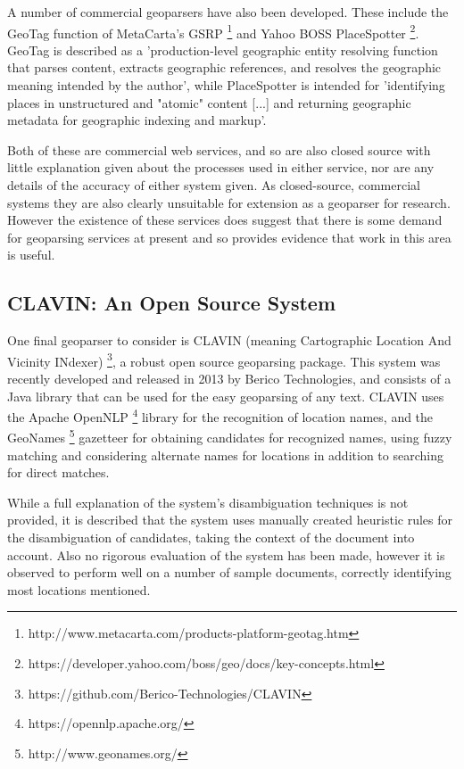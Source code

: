 \documentclass[12pt, a4paper]{report}
\begin{document}
A number of commercial geoparsers have also been developed. These include the GeoTag function of MetaCarta's GSRP \footnote{http://www.metacarta.com/products-platform-geotag.htm} and Yahoo BOSS PlaceSpotter \footnote{https://developer.yahoo.com/boss/geo/docs/key-concepts.html}. GeoTag is described as a 'production-level geographic entity resolving function that parses content, extracts geographic references, and resolves the geographic meaning intended by the author', while PlaceSpotter is intended for 'identifying places in unstructured and "atomic" content [...] and returning geographic metadata for geographic indexing and markup'.

Both of these are commercial web services, and so are also closed source with little explanation given about the processes used in either service, nor are any details of the accuracy of either system given. As closed-source, commercial systems they are also clearly unsuitable for extension as a geoparser for research. However the existence of these services does suggest that there is some demand for geoparsing services at present and so provides evidence that work in this area is useful.
 
\subsection{CLAVIN: An Open Source System}
\label{subsec:clavin}

One final geoparser to consider is CLAVIN (meaning Cartographic Location And Vicinity INdexer) \footnote{https://github.com/Berico-Technologies/CLAVIN}, a robust open source geoparsing package. This system was recently developed and released in 2013 by Berico Technologies, and consists of a Java library that can be used for the easy geoparsing of any text. CLAVIN uses the Apache OpenNLP \footnote{https://opennlp.apache.org/} library for the recognition of location names, and the GeoNames \footnote{http://www.geonames.org/} gazetteer for obtaining candidates for recognized names, using fuzzy matching and considering alternate names for locations in addition to searching for direct matches.

While a full explanation of the system's disambiguation techniques is not provided, it is described that the system uses manually created heuristic rules for the disambiguation of candidates, taking the context of the document into account. Also no rigorous evaluation of the system has been made, however it is observed to perform well on a number of sample documents, correctly identifying most locations mentioned.
\end{document}
